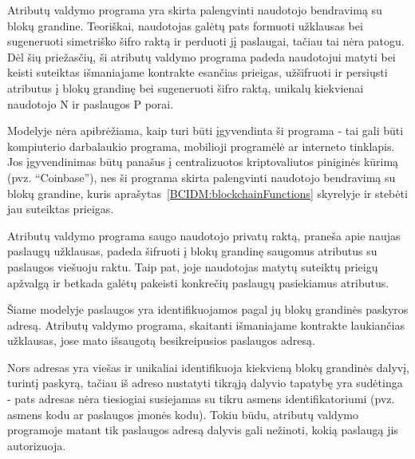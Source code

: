 
Atributų valdymo programa yra skirta palengvinti naudotojo bendravimą su blokų grandine. Teoriškai, naudotojas galėtų pats formuoti užklausas
bei sugeneruoti simetriško šifro raktą ir perduoti jį paslaugai, tačiau tai nėra patogu. Dėl šių priežasčių, ši atributų valdymo
programa padeda naudotojui matyti bei keisti suteiktas išmaniajame kontrakte esančias prieigas, užšifruoti ir persiųsti atributus į blokų grandinę
bei sugeneruoti šifro raktą, unikalų kiekvienai naudotojo N ir paslaugos P porai.

Modelyje nėra apibrėžiama, kaip turi būti įgyvendinta ši programa - tai gali būti kompiuterio darbalaukio programa,
mobilioji programėlė ar 
interneto tinklapis. Jos įgyvendinimas būtų panašus į centralizuotos kriptovaliutos piniginės kūrimą (pvz. \enquote{Coinbase}), nes ši
programa skirta palengvinti naudotojo bendravimą su blokų grandine, kuris aprašytas\hypertarget{BCIDM:blockchainFunctions}{~\ref{BCIDM:blockchainFunctions}} skyrelyje ir
stebėti jau suteiktas prieigas.

Atributų valdymo programa saugo naudotojo privatų raktą, praneša apie naujas paslaugų užklausas, padeda šifruoti
į blokų grandinę saugomus atributus su paslaugos viešuoju raktu. Taip pat, joje naudotojas
matytų suteiktų prieigų apžvalgą ir betkada galėtų pakeisti konkrečių paslaugų pasiekiamus atributus.


Šiame modelyje paslaugos yra identifikuojamos pagal jų blokų grandinės paskyros adresą. Atributų valdymo programa,
skaitanti išmaniajame kontrakte laukiančias užklausas, jose mato išsaugotą besikreipusios paslaugos adresą.

Nors adresas yra viešas ir unikaliai identifikuoja kiekvieną blokų grandinės dalyvį, turintį paskyrą, tačiau iš adreso nustatyti tikrąją dalyvio tapatybę yra sudėtinga -
pats adresas nėra tiesiogiai susiejamas su tikru asmens identifikatoriumi (pvz. asmens kodu ar paslaugos įmonės kodu).
Tokiu būdu, atributų valdymo programoje matant tik paslaugos adresą dalyvis gali nežinoti, kokią paslaugą jis autorizuoja.

